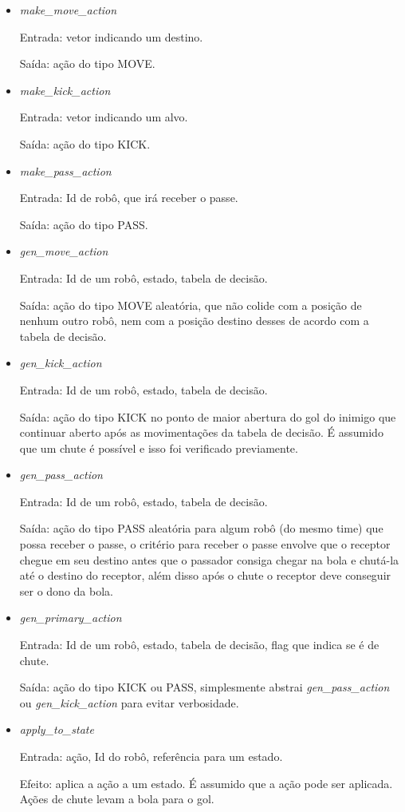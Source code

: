 \begin{itemize}
  \item \textit{make_move_action}
    \par Entrada: vetor indicando um destino.
    \par Saída: ação do tipo MOVE.
  \item \textit{make_kick_action}
    \par Entrada: vetor indicando um alvo.
    \par Saída: ação do tipo KICK.
  \item \textit{make_pass_action}
    \par Entrada: Id de robô, que irá receber o passe.
    \par Saída: ação do tipo PASS.
  \item \textit{gen_move_action}
    \par Entrada: Id de um robô, estado, tabela de decisão.
    \par Saída: ação do tipo MOVE aleatória, que não colide com a posição de
    nenhum outro robô, nem com a posição destino desses de acordo com a tabela
    de decisão.
  \item \textit{gen_kick_action}
    \par Entrada: Id de um robô, estado, tabela de decisão.
    \par Saída: ação do tipo KICK no ponto de maior abertura do gol do inimigo
    que continuar aberto após as movimentações da tabela de decisão.  É assumido
    que um chute é possível e isso foi verificado previamente.
  \item \textit{gen_pass_action}
    \par Entrada: Id de um robô, estado, tabela de decisão.
    \par Saída: ação do tipo PASS aleatória para algum robô (do mesmo time) que
    possa receber o passe, o critério para receber o passe envolve que o
    receptor chegue em seu destino antes que o passador consiga chegar na bola e
    chutá-la até o destino do receptor, além disso após o chute o receptor deve
    conseguir ser o dono da bola.
  \item \textit{gen_primary_action}
    \par Entrada: Id de um robô, estado, tabela de decisão, flag que indica se é
    de chute.
    \par Saída: ação do tipo KICK ou PASS, simplesmente abstrai
    \textit{gen_pass_action} ou \textit{gen_kick_action} para evitar verbosidade.
  \item \textit{apply_to_state}
    \par Entrada: ação, Id do robô, referência para um estado.
    \par Efeito: aplica a ação a um estado.  É assumido que a ação pode ser
    aplicada.  Ações de chute levam a bola para o gol.
\end{itemize}

